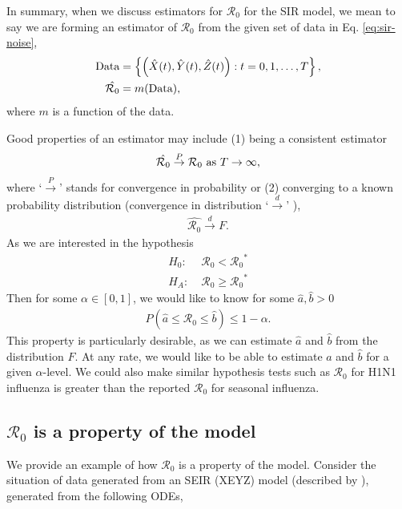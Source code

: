 \documentclass[12pt]{article}
\newcommand{\rr}{\ensuremath{\mathcal{R}_0}}
\begin{document}
In summary, when we discuss estimators for $\rr$ for the SIR model, we mean to say we are forming an estimator of $\rr$ from the given set of data in Eq. \ref{eq:sir-noise},
\begin{align*}
  \textnormal{Data} &= \left \{\left (\hat{X}(t), \hat{Y}(t), \hat{Z}(t) \right ) : t=0, 1, \dots, T\right \}, \\
  \hat{\rr} &= m(\textnormal{Data}),
\end{align*}
where $m$ is a function of the data.

Good properties of an estimator may include (1) being a consistent estimator
\begin{align*}
  \hat{\rr} \overset{P}{\to} \rr \textnormal{ as } T\to \infty,
\end{align*}
where `$\overset{P}{\to}$' stands for convergence in probability or (2) converging to a known probability distribution (convergence in distribution `$\overset{d}{\to}$' \citep{wasserman2004}),
\begin{align*}
\hat{\rr} \overset{d}{\to} F.  
\end{align*}
As we are interested in the hypothesis
\begin{align*}
  H_0:\;& \rr < \rr^* \\
  H_A:\;& \rr \ge \rr^*
\end{align*}
Then for some $\alpha \in [0,1]$, we would like to know for some $\hat{a}, \hat{b} >0$
\begin{align*}
P(\hat{a} \le \rr \le \hat{b}) \le 1 - \alpha.
\end{align*}
This property is particularly desirable, as we can estimate $\hat{a}$ and $\hat{b}$ from the distribution $F$.  At any rate, we would like to be able to estimate $\hat{a}$ and $\hat{b}$ for a given $\alpha$-level.  We could also make similar hypothesis tests such as  $\rr$ for H1N1 influenza is greater than the reported $\rr$ for seasonal influenza.

\subsection{$\rr$ is a property of the model}

We provide an example of how $\rr$ is a property of the model.  Consider the situation of data generated from an SEIR (XEYZ) model (described by \cite{cintronarias2009}), generated from the following ODEs,
\end{document}
